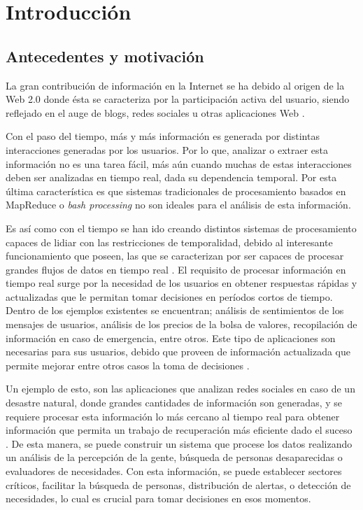 \chapter{Introducción}
\label{cap:introduccion}

\section{Antecedentes y motivación}
\label{intro:motivacion}

La gran contribución de información en la Internet se ha debido al origen de la Web 2.0 donde ésta se caracteriza por la participación activa del usuario, siendo reflejado en el auge de blogs, redes sociales u otras aplicaciones Web \citep{web2007oberhelman}.


Con el paso del tiempo, más y más información es generada por distintas interacciones generadas por los usuarios. Por lo que, analizar o extraer esta información no es una tarea fácil, más aún cuando muchas de estas interacciones deben ser analizadas en tiempo real, dada su dependencia temporal. Por esta última característica es que sistemas tradicionales de procesamiento basados en MapReduce \citep{2010Lin} o \textit{bash processing} \citep{HawwashN14} no son ideales para el análisis de esta información.

Es así como con el tiempo se han ido creando distintos sistemas de procesamiento capaces de lidiar con las restricciones de temporalidad, debido al interesante funcionamiento que poseen, las que se caracterizan por ser capaces de procesar grandes flujos de datos en tiempo real \citep{ChenZ14a}. El requisito de procesar informaci\'on en tiempo real surge por la necesidad de los usuarios en obtener respuestas r\'apidas y actualizadas que le permitan tomar decisiones en per\'iodos cortos de tiempo. Dentro de los ejemplos existentes se encuentran; análisis de sentimientos de los mensajes de usuarios, análisis de los precios de la bolsa de valores, recopilación de información en caso de emergencia, entre otros. Este tipo de aplicaciones son necesarias para sus usuarios, debido que proveen de información actualizada que permite mejorar entre otros casos la toma de decisiones \citep{Wenzel14}.

Un ejemplo de esto, son las aplicaciones que analizan redes sociales en caso de un desastre natural, donde grandes cantidades de información son generadas, y se requiere procesar esta información lo más cercano al tiempo real para obtener información que permita un trabajo de recuperación más eficiente dado el suceso \citep{andrade2014fundamentals}. De esta manera, se puede construir un sistema que procese los datos realizando un análisis de la percepción de la gente, búsqueda de personas desaparecidas o evaluadores de necesidades. Con esta información, se puede establecer sectores críticos, facilitar la búsqueda de personas, distribución de alertas, o detección de necesidades, lo cual es crucial para tomar decisiones en esos momentos.

